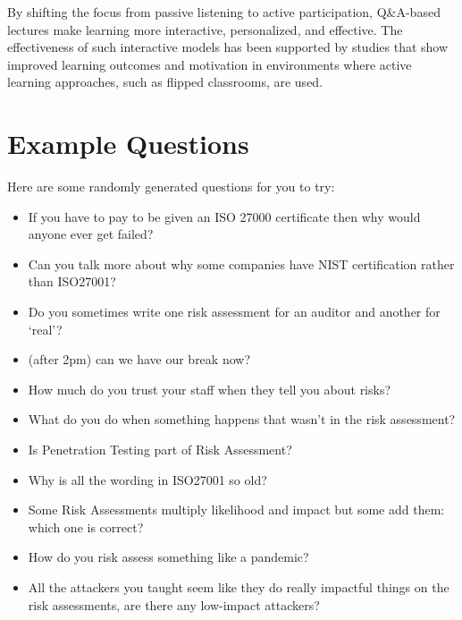 \documentclass[12pt]{article}
\begin{document}
By shifting the focus from passive listening to active participation, Q\&A-based lectures make learning more interactive, personalized, and effective. The effectiveness of such interactive models has been supported by studies that show improved learning outcomes and motivation in environments where active learning approaches, such as flipped classrooms, are used.\cite{ZhengLanqin2020TEot}

\section{Example Questions} 
Here are some randomly generated questions for you to try: 

\begin{itemize}
  \item If you have to pay to be given an ISO 27000 certificate then why would anyone ever get failed?
  \item Can you talk more about why some companies have NIST certification rather than ISO27001?
  \item Do you sometimes write one risk assessment for an auditor and another for `real'?
  \item (after 2pm) can we have our break now?
  \item How much do you trust your staff when they tell you about risks?
  \item What do you do when something happens that wasn't in the risk assessment?
  \item Is Penetration Testing part of Risk Assessment?
  \item Why is all the wording in ISO27001 so old?
  \item Some Risk Assessments multiply likelihood and impact but some add them: which one is correct?
  \item How do you risk assess something like a pandemic?
  \item All the attackers you taught seem like they do really impactful things on the risk assessments, are there any low-impact attackers?
\end{itemize}







\maketitle
\end{document}
